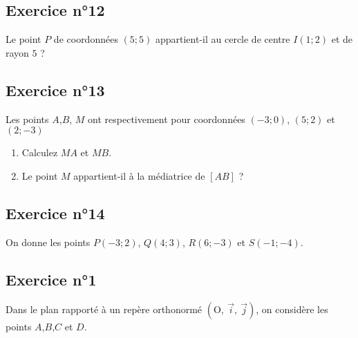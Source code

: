 \documentclass[12pt,a4paper]{article}
\def\Oij{$\left(\text{O},~\vec{i},~\vec{j}\right)$}
\begin{document}
\subsection*{Exercice n°12}
Le point $P$ de coordonnées $(5;5)$ appartient-il au cercle de centre $I(1;2)$ et de rayon $5$ ? 

\subsection*{Exercice n°13}

Les points $A$,$B$, $M$ ont respectivement pour coordonnées $(-3;0)$, $(5;2)$ et $(2;-3)$
\begin{enumerate}
    \item Calculez $MA$ et $MB$.
    \item Le point $M$ appartient-il à la médiatrice de $[AB]$ ?
\end{enumerate}

\subsection*{Exercice n°14}

On donne les points $P(-3;2)$, $Q(4;3)$, $R(6;-3)$ et $S(-1;-4)$.


\subsection*{Exercice n°1}

Dans le plan rapporté à un repère orthonormé \Oij{}, on considère les points $A$,$B$,$C$ et $D$.

\begin{center}
\end{center}
\end{document}
